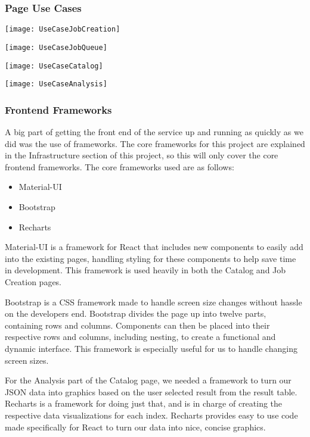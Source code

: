 \subsubsection{Page Use Cases}
\begin{center}
  \texttt{[image: UseCaseJobCreation]} \\[12pt]
\end{center}
\begin{center}
  \texttt{[image: UseCaseJobQueue]} \\[12pt]
\end{center}
\begin{center}
  \texttt{[image: UseCaseCatalog]} \\[12pt]
\end{center}
\begin{center}
  \texttt{[image: UseCaseAnalysis]} \\[12pt]
\end{center}

\subsubsection{Frontend Frameworks}
A big part of getting the front end of the service up and running as quickly as we did was the use of frameworks. The core frameworks for this project are explained in the Infrastructure section of this project, so this will only cover the core frontend frameworks. The core frameworks used are as follows:
\begin{itemize}
  \item Material-UI
  \item Bootstrap
  \item Recharts
\end{itemize}
Material-UI is a framework for React that includes new components to easily add into the existing pages, handling styling for these components to help save time in development. This framework is used heavily in both the Catalog and Job Creation pages.\par
Bootstrap is a CSS framework made to handle screen size changes without hassle on the developer\textquotesingle s end. Bootstrap divides the page up into twelve parts, containing rows and columns. Components can then be placed into their respective rows and columns, including nesting, to create a functional and dynamic interface. This framework is especially useful for us to handle changing screen sizes.\par
For the Analysis part of the Catalog page, we needed a framework to turn our JSON data into graphics based on the user selected result from the result table. Recharts is a framework for doing just that, and is in charge of creating the respective data visualizations for each index. Recharts provides easy to use code made specifically for React to turn our data into nice, concise graphics.
